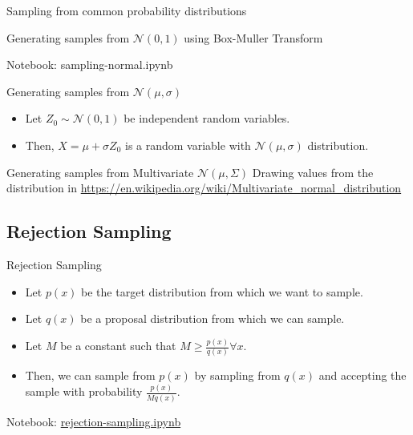 \documentclass{beamer}
\begin{document}
\begin{section}{Sampling from common probability distributions}
\begin{frame}{Generating samples from $\mathcal{N}(0, 1)$ using Box-Muller Transform}
\end{frame}

\begin{frame}
    Notebook: sampling-normal.ipynb
\end{frame}

\begin{frame}{Generating samples from $\mathcal{N}(\mu, \sigma)$}
    \begin{itemize}
        \item Let $Z_0 \sim \mathcal{N}(0, 1)$ be independent random variables.
        \item \pause Then, $X = \mu + \sigma Z_0$ is a random variable with $\mathcal{N}(\mu, \sigma)$ distribution.
    \end{itemize}
    
\end{frame}

\begin{frame}{Generating samples from Multivariate $\mathcal{N}(\mu, \Sigma)$}
    Drawing values from the distribution in \url{https://en.wikipedia.org/wiki/Multivariate_normal_distribution}
\end{frame}


    
\end{section}

\subsection{Rejection Sampling}
    \begin{frame}{Rejection Sampling}
        \begin{itemize}
            \item Let $p(x)$ be the target distribution from which we want to sample.
            \pause \item Let $q(x)$ be a proposal distribution from which we can sample.
            \pause \item Let $M$ be a constant such that $M \geq \frac{p(x)}{q(x)} \forall x$.
            \pause \item Then, we can sample from $p(x)$ by sampling from $q(x)$ and accepting the sample with probability $\frac{p(x)}{M q(x)}$.
        \end{itemize}
        
    \end{frame}

    \begin{frame}
        Notebook: \url{rejection-sampling.ipynb}
    \end{frame}
\end{document}
